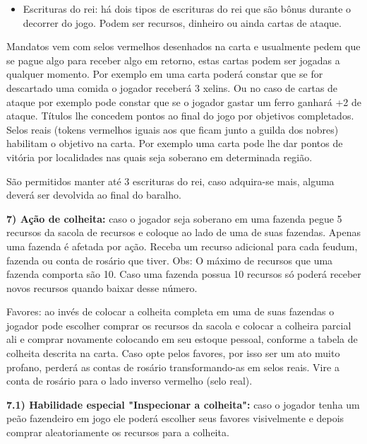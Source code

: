 \documentclass[11pt]{article}
\begin{document}
\begin{itemize}
\item Escrituras do rei: há dois tipos de escrituras do rei que são bônus durante o decorrer do jogo. Podem ser recursos, dinheiro ou ainda cartas de ataque.
\end{itemize}
Mandatos vem com selos vermelhos desenhados na carta e usualmente pedem que se pague algo para receber algo em retorno, estas cartas podem ser jogadas a qualquer momento.
Por exemplo em uma carta poderá constar que se for descartado uma comida o jogador receberá 3 xelins.
Ou no caso de cartas de ataque por exemplo pode constar que se o jogador gastar um ferro ganhará +2 de ataque.
Títulos lhe concedem pontos ao final do jogo por objetivos completados. Selos reais (tokens vermelhos iguais aos que ficam junto a guilda dos nobres) habilitam o objetivo na carta.
Por exemplo uma carta pode lhe dar pontos de vitória por localidades nas quais seja soberano em determinada região.

São permitidos manter até 3 escrituras do rei, caso adquira-se mais, alguma deverá ser devolvida ao final do baralho.

\textbf{7) Ação de colheita:} caso o jogador seja soberano em uma fazenda pegue 5 recursos da sacola de recursos e coloque ao lado de uma de suas fazendas. Apenas uma fazenda é afetada por ação.
Receba um recurso adicional para cada feudum, fazenda ou conta de rosário que tiver.
Obs: O máximo de recursos que uma fazenda comporta são 10. Caso uma fazenda possua 10 recursos só poderá receber novos recursos quando baixar desse número.

Favores: ao invés de colocar a colheita completa em uma de suas fazendas o jogador pode escolher comprar os recursos da sacola e colocar a colheira parcial ali e comprar novamente colocando
em seu estoque pessoal, conforme a tabela de colheita descrita na carta. Caso opte pelos favores, por isso ser um ato muito profano, perderá as contas de rosário transformando-as em selos reais.
Vire a conta de rosário para o lado inverso vermelho (selo real).

\textbf{7.1) Habilidade especial "Inspecionar a colheita":} caso o jogador tenha um peão fazendeiro em jogo ele poderá escolher seus favores visivelmente e depois comprar aleatoriamente
os recursos para a colheita.
\end{document}
